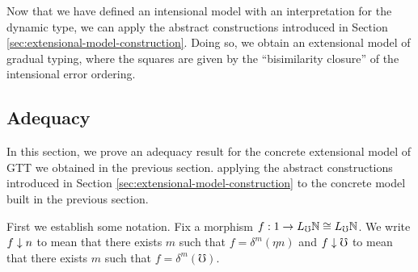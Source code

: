 
Now that we have defined an intensional model with an interpretation for the dynamic type, we can apply
the abstract constructions introduced in Section \ref{sec:extensional-model-construction}.
Doing so, we obtain an extensional model of gradual typing, where the squares are given by the
``bisimilarity closure'' of the intensional error ordering.

\subsection{Adequacy}\label{sec:adequacy}

In this section, we prove an adequacy result for the concrete extensional model of GTT we obtained in the previous section.
applying the abstract constructions introduced in Section
\ref{sec:extensional-model-construction} to the concrete model built in the previous section.

First we establish some notation. Fix a morphism $f : 1 \to L_\mho \mathbb{N} \cong L_\mho \mathbb{N}$.
We write $f \downarrow n$ to mean that there exists $m$ such that $f = \delta^m(\eta n)$
and $f \downarrow \mho$ to mean that there exists $m$ such that $f = \delta^m(\mho)$.

